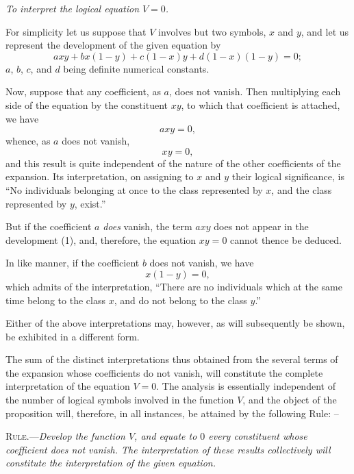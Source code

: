 \documentclass[oneside]{book}
\begin{document}
\textit{To interpret the logical equation $V = 0$.}

For simplicity let us suppose that $V$ involves but two symbols,
$x$ and $y$, and let us represent the development of the given
equation by
\begin{equation}
axy + bx\left(1-y\right) + c\left(1-x\right)y + d\left(1-x\right)\left(1-y\right)=0;
\end{equation}
$a$, $b$, $c$, and $d$ being definite numerical constants.

Now, suppose that any coefficient, as $a$, does not vanish.
Then multiplying each side of the equation by the constituent $xy$,
to which that coefficient is attached, we have
\[
axy = 0,
\]
whence, as $a$ does not vanish,
\[
xy = 0,
\]
and this result is quite independent of the nature of the other coefficients
of the expansion. Its interpretation, on assigning to
$x$ and $y$ their logical significance, is ``No individuals belonging at
once to the class represented by $x$, and the class represented by $y$,
exist.''

But if the coefficient $a$ \textit{does} vanish, the term $axy$ does not
appear in the development (1), and, therefore, the equation $xy = 0$
cannot thence be deduced.

In like manner, if the coefficient $b$ does not vanish, we have
\[
x\left(1-y\right) = 0,
\]
which admits of the interpretation, ``There are no individuals
which at the same time belong to the class $x$, and do not belong
to the class $y$.''

Either of the above interpretations may, however, as will subsequently
be shown, be exhibited in a different form.

The sum of the distinct interpretations thus obtained from
the several terms of the expansion whose coefficients do not
vanish, will constitute the complete interpretation of the equation
$V = 0$. The analysis is essentially independent of the number
of logical symbols involved in the function $V$, and the object of
the proposition will, therefore, in all instances, be attained by the
following Rule: --

\textsc{Rule.}---\textit{Develop the function $V$, and equate to $0$ every constituent
whose coefficient does not vanish. The interpretation of these
results collectively will constitute the interpretation of the given
equation.}
\end{document}
